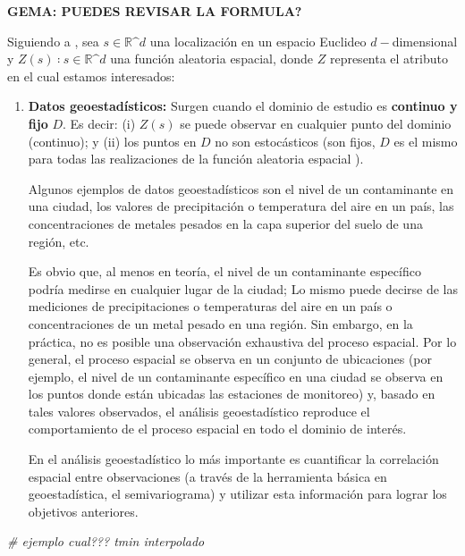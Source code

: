 \documentclass[
]{book}
\newenvironment{Shaded}{\begin{snugshade}}{\end{snugshade}}
\newcommand{\CommentTok}[1]{\textcolor[rgb]{0.56,0.35,0.01}{\textit{#1}}}
\begin{document}
\textbf{GEMA: PUEDES REVISAR LA FORMULA?}

Siguiendo a \citet{cressie1993}, sea \(s ∈ ℝ\^d\) una localización en un espacio Euclideo
\(d-\)dimensional y \({Z(s)∶ s ∈ ℝ\^d}\) una función aleatoria espacial, donde \(Z\)
representa el atributo en el cual estamos interesados:

\begin{enumerate}
\def\labelenumi{\arabic{enumi}.}
\item
  \textbf{Datos geoestadísticos:} Surgen cuando el dominio de estudio es \textbf{continuo
  y fijo} \(D\). Es decir: (i) \(Z(s)\) se puede observar en cualquier punto del
  dominio (continuo); y (ii) los puntos en \(D\) no son estocásticos (son fijos,
  \(D\) es el mismo para todas las realizaciones de la función aleatoria
  espacial ).

  Algunos ejemplos de datos geoestadísticos son el nivel de un contaminante en
  una ciudad, los valores de precipitación o temperatura del aire en un país,
  las concentraciones de metales pesados en la capa superior del suelo de una
  región, etc.

  Es obvio que, al menos en teoría, el nivel de un contaminante específico
  podría medirse en cualquier lugar de la ciudad; Lo mismo puede decirse de
  las mediciones de precipitaciones o temperaturas del aire en un país o
  concentraciones de un metal pesado en una región. Sin embargo, en la
  práctica, no es posible una observación exhaustiva del proceso espacial. Por
  lo general, el proceso espacial se observa en un conjunto de ubicaciones
  (por ejemplo, el nivel de un contaminante específico en una ciudad se
  observa en los puntos donde están ubicadas las estaciones de monitoreo) y,
  basado en tales valores observados, el análisis geoestadístico reproduce el
  comportamiento de el proceso espacial en todo el dominio de interés.

  En el análisis geoestadístico lo más importante es cuantificar la
  correlación espacial entre observaciones (a través de la herramienta básica
  en geoestadística, el semivariograma) y utilizar esta información para
  lograr los objetivos anteriores.
\end{enumerate}

\begin{Shaded}
\begin{Highlighting}[]
\CommentTok{\# ejemplo cual??? tmin interpolado}
\end{Highlighting}
\end{Shaded}
\end{document}

